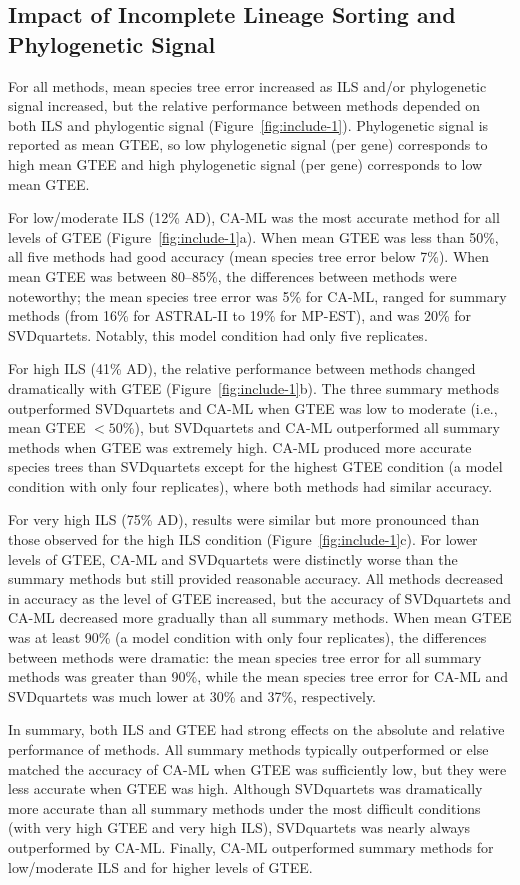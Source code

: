 \subsection{Impact of Incomplete Lineage Sorting and Phylogenetic Signal} 
For all methods, mean species tree error increased as ILS and/or phylogenetic signal increased, but the relative performance between methods depended on both ILS and phylogentic signal (Figure~\ref{fig:include-1}). 
Phylogenetic signal is reported as mean GTEE, so low phylogenetic signal (per gene) corresponds to high mean GTEE and high phylogenetic signal (per gene) corresponds to low mean GTEE.

For low/moderate ILS (12\% AD), CA-ML was the most accurate method for all levels of GTEE (Figure~\ref{fig:include-1}a). 
When mean GTEE was less than 50\%, all five methods had good accuracy (mean species tree error below 7\%). 
When mean GTEE was between 80--85\%, the differences between methods were noteworthy; the mean species tree error was 5\% for CA-ML, ranged for summary methods (from 16\% for ASTRAL-II to 19\% for MP-EST), and was 20\% for SVDquartets. 
Notably, this model condition had only five replicates.

For high ILS (41\% AD), the relative performance between methods changed dramatically with GTEE (Figure~\ref{fig:include-1}b). 
The three summary methods outperformed SVDquartets and CA-ML when GTEE was low to moderate (i.e., mean GTEE $<50\%$), but SVDquartets and CA-ML outperformed all summary methods when GTEE was extremely high. 
CA-ML produced more accurate species trees than SVDquartets except for the highest GTEE condition (a model condition with only four replicates), where both methods had similar accuracy.

For very high ILS (75\% AD), results were similar but more pronounced than those observed for the high ILS condition (Figure~\ref{fig:include-1}c). For lower levels of GTEE, CA-ML and SVDquartets were distinctly worse than the summary methods but still provided reasonable accuracy. All methods decreased in accuracy as the level of GTEE increased, but the accuracy of SVDquartets and CA-ML decreased more gradually than all summary methods. When mean GTEE was at least 90\% (a model condition with only four replicates), the differences between methods were dramatic: the mean species tree error for all summary methods was greater than 90\%, while the mean species tree error for CA-ML and SVDquartets was much lower at 30\% and 37\%, respectively.

In summary, both ILS and GTEE had strong effects on the absolute and relative performance of methods. 
All summary methods typically outperformed or else matched the accuracy of CA-ML when GTEE was sufficiently low, but they were less accurate when GTEE was high. 
Although SVDquartets was dramatically more accurate than all summary methods under the most difficult conditions (with very high GTEE and very high ILS), SVDquartets was nearly always outperformed by CA-ML.
Finally, CA-ML outperformed summary methods for low/moderate ILS and for higher levels of GTEE. 

